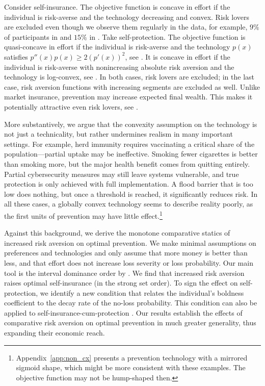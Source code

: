 \documentclass[11pt]{article}
\begin{document}
Consider self-insurance. The objective function is concave in effort if the individual is risk-averse and the technology decreasing and convex. Risk lovers are excluded even though we observe them regularly in the data, for example, $9\%$ of participants in \cite{dohmen2011individual} and $15\%$ in \cite{noussair2014higher}. Take self-protection. The objective function is quasi-concave in effort if the individual is risk-averse and the technology $p(x)$ satisfies $p''(x) p(x) \geq 2(p'(x))^2$, see \cite{jullien1999should}. It is concave in effort if the individual is risk-averse with nonincreasing absolute risk aversion and the technology is log-convex, see \cite{fagart2013first}. In both cases, risk lovers are excluded; in the last case, risk aversion functions with increasing segments are excluded as well. Unlike market insurance, prevention may increase expected final wealth. This makes it potentially attractive even risk lovers, see \cite{jindapon2013risk}.

More substantively, we argue that the convexity assumption on the technology is not just a technicality, but rather undermines realism in many important settings. For example, herd immunity requires vaccinating a critical share of the population—partial uptake may be ineffective. Smoking fewer cigarettes is better than smoking more, but the major health benefit comes from quitting entirely. Partial cybersecurity measures may still leave systems vulnerable, and true protection is only achieved with full implementation. A flood barrier that is too low does nothing, but once a threshold is reached, it significantly reduces risk. In all these cases, a globally convex technology seems to describe reality poorly, as the first units of prevention may have little effect.\footnote{Appendix~\ref{app:non_cx} presents a prevention technology with a mirrored sigmoid shape, which might be more consistent with these examples. The objective function may not be hump-shaped then.}

Against this background, we derive the monotone comparative statics of increased risk aversion on optimal prevention. We make minimal assumptions on preferences and technologies and only assume that more money is better than less, and that effort does not increase loss severity or loss probability. Our main tool is the interval dominance order by \cite{quah2009comparative}. We find that increased risk aversion raises optimal self-insurance (in the strong set order). To sign the effect on self-protection, we identify a new condition that relates the individual's boldness coefficient to the decay rate of the no-loss probability. This condition can also be applied to self-insurance-cum-protection \citep[see][]{lee1998risk}. Our results establish the effects of comparative risk aversion on optimal prevention in much greater generality, thus expanding their economic reach.
\end{document}
